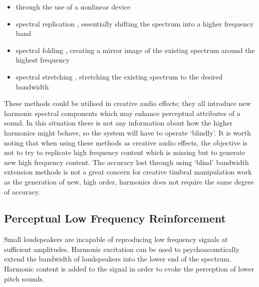 		\begin{itemize}
			\item through the use of a nonlinear device \citep{larsen2002efficient, sha2010high}
			\item spectral replication \citep{nagel2010a}, essentially shifting the spectrum into a higher
				frequency band
			\item spectral folding \citep{friedrich2007spectral}, creating a mirror image of the existing
			      spectrum around the highest frequency
			\item spectral stretching \citep{nagel2009a}, stretching the existing spectrum to the desired
			      bandwidth
		\end{itemize}

		These methods could be utilised in creative audio effects; they all introduce new harmonic spectral
		components which may enhance perceptual attributes of a sound. In this situation there is not any
		information about how the higher harmonics might behave, so the system will have to operate `blindly'. It
		is worth noting that when using these methods as creative audio effects, the objective is not to try to
		replicate high frequency content which is missing but to generate new high frequency content. The accuracy
		lost through using `blind' bandwidth extension methods is not a great concern for creative timbral
		manipulation work as the generation of new, high order, harmonics does not require the same degree of
		accuracy.

	\subsection{Perceptual Low Frequency Reinforcement}
	\label{sec:Excitation-Uses-Reinforcement}
		Small loudspeakers are incapable of reproducing low frequency signals at sufficient amplitudes. Harmonic
		excitation can be used to psychoacoustically extend the bandwidth of loudspeakers into the lower end of the
		spectrum. Harmonic content is added to the signal in order to evoke the perception of lower pitch sounds.
		
